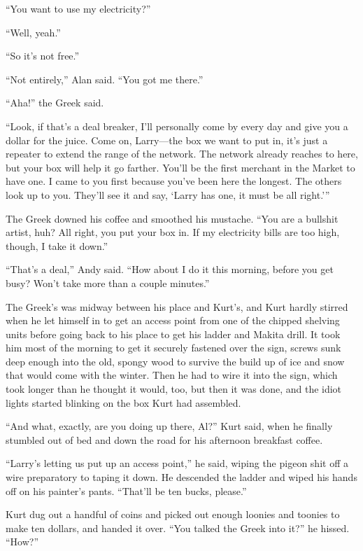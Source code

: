 ``You want to use my electricity?''

``Well, yeah.''

``So it's not free.''

``Not entirely,'' Alan said.  ``You got me there.''

``Aha!'' the Greek said.

``Look, if that's a deal breaker, I'll personally come by every day
and give you a dollar for the juice.  Come on, Larry---the box we want
to put in, it's just a repeater to extend the range of the network. 
The network already reaches to here, but your box will help it go
farther.  You'll be the first merchant in the Market to have one.  I
came to you first because you've been here the longest.  The others
look up to you.  They'll see it and say, `Larry has one, it must be
all right.'''

The Greek downed his coffee and smoothed his mustache.  ``You are a
bullshit artist, huh?  All right, you put your box in.  If my
electricity bills are too high, though, I take it down.''

``That's a deal,'' Andy said.  ``How about I do it this morning,
before you get busy?  Won't take more than a couple minutes.''

The Greek's was midway between his place and Kurt's, and Kurt hardly
stirred when he let himself in to get an access point from one of the
chipped shelving units before going back to his place to get his
ladder and Makita drill.  It took him most of the morning to get it
securely fastened over the sign, screws sunk deep enough into the old,
spongy wood to survive the build up of ice and snow that would come
with the winter.  Then he had to wire it into the sign, which took
longer than he thought it would, too, but then it was done, and the
idiot lights started blinking on the box Kurt had assembled.

``And what, exactly, are you doing up there, Al?'' Kurt said, when he
finally stumbled out of bed and down the road for his afternoon
breakfast coffee.

``Larry's letting us put up an access point,'' he said, wiping the
pigeon shit off a wire preparatory to taping it down.  He descended
the ladder and wiped his hands off on his painter's pants.  ``That'll
be ten bucks, please.''

Kurt dug out a handful of coins and picked out enough loonies and
toonies to make ten dollars, and handed it over.  ``You talked the
Greek into it?'' he hissed.  ``How?''

